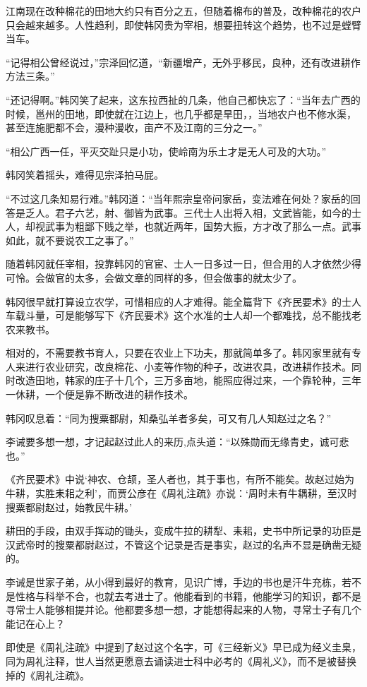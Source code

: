江南现在改种棉花的田地大约只有百分之五，但随着棉布的普及，改种棉花的农户只会越来越多。人性趋利，即使韩冈贵为宰相，想要扭转这个趋势，也不过是螳臂当车。

“记得相公曾经说过，”宗泽回忆道，“新疆增产，无外乎移民，良种，还有改进耕作方法三条。”

“还记得啊。”韩冈笑了起来，这东拉西扯的几条，他自己都快忘了：“当年去广西的时候，邕州的田地，即使就在江边上，也几乎都是旱田，，当地农户也不修水渠，甚至连施肥都不会，漫种漫收，亩产不及江南的三分之一。”

“相公广西一任，平灭交趾只是小功，使岭南为乐土才是无人可及的大功。”

韩冈笑着摇头，难得见宗泽拍马屁。

“不过这几条知易行难。”韩冈道：“当年熙宗皇帝问家岳，变法难在何处？家岳的回答是乏人。君子六艺，射、御皆为武事。三代士人出将入相，文武皆能，如今的士人，却视武事为粗鄙下贱之举，也就近两年，国势大振，方才改了那么一点。武事如此，就不要说农工之事了。”

随着韩冈就任宰相，投靠韩冈的官宦、士人一日多过一日，但合用的人才依然少得可怜。会做官的太多，会做文章的同样的多，但会做事的就太少了。

韩冈很早就打算设立农学，可惜相应的人才难得。能全篇背下《齐民要术》的士人车载斗量，可是能够写下《齐民要术》这个水准的士人却一个都难找，总不能找老农来教书。

相对的，不需要教书育人，只要在农业上下功夫，那就简单多了。韩冈家里就有专人来进行农业研究，改良棉花、小麦等作物的种子，改进农具，改进耕作技术。同时改造田地，韩家的庄子十几个，三万多亩地，能照应得过来，一个靠轮种，三年一休耕，一个便是靠不断改进的耕作技术。

韩冈叹息着：“同为搜粟都尉，知桑弘羊者多矣，可又有几人知赵过之名？”

李诫要多想一想，才记起赵过此人的来历,点头道：“以殊勋而无缘青史，诚可悲也。”

《齐民要术》中说‘神农、仓颉，圣人者也，其于事也，有所不能矣。故赵过始为牛耕，实胜耒耜之利’，而贾公彦在《周礼注疏》亦说：‘周时未有牛耦耕，至汉时搜粟都尉赵过，始教民牛耕。’

耕田的手段，由双手挥动的锄头，变成牛拉的耕犁、耒耜，史书中所记录的功臣是汉武帝时的搜粟都尉赵过，不管这个记录是否是事实，赵过的名声不显是确凿无疑的。

李诫是世家子弟，从小得到最好的教育，见识广博，手边的书也是汗牛充栋，若不是性格与科举不合，也就去考进士了。他能看到的书籍，他能学习的知识，都不是寻常士人能够相提并论。他都要多想一想，才能想得起来的人物，寻常士子有几个能记在心上？

即使是《周礼注疏》中提到了赵过这个名字，可《三经新义》早已成为经义圭臬，同为周礼注释，世人当然更愿意去诵读进士科中必考的《周礼义》，而不是被替换掉的《周礼注疏》。

